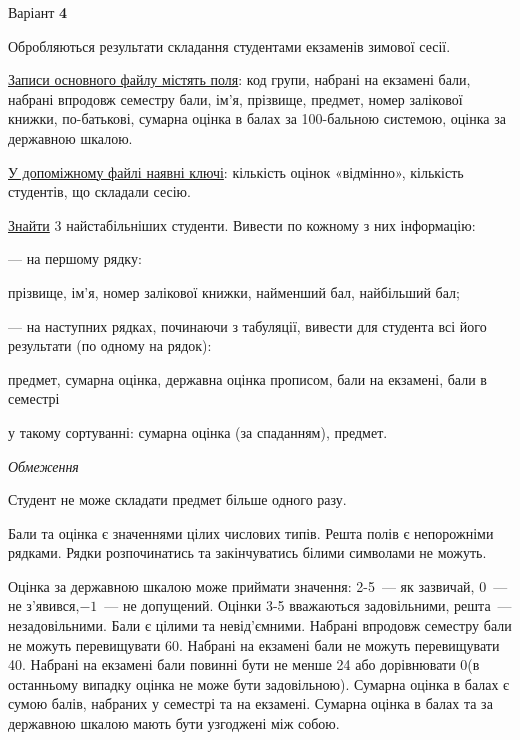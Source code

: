 \documentclass[11pt, ukrainian]{article}
\begin{document}
\par
\newpage
{\center Варіант  \No \textbf { 4 }\par}
\bigskip
Обробляються результати складання студентами екзаменів зимової сесії.

\underline{Записи основного файлу містять поля}: код групи, набрані на екзамені бали, набрані впродовж семестру бали, ім’я, прізвище, предмет, номер залікової книжки, по-батькові, сумарна оцінка в балах за 100-бальною системою, оцінка за державною шкалою.

\underline{У допоміжному файлі наявні ключі}: кількість оцінок «відмінно», кількість студентів, що складали сесію.

\underline{Знайти} 3 найстабільніших студенти. Вивести по кожному з них інформацію:\par
{\noindent}--- на першому рядку:\par
прізвище, ім’я, номер залікової книжки, найменший бал, найбільший бал;

{\noindent}--- на наступних рядках, починаючи з табуляції, вивести для студента всі його результати (по одному на рядок):\par
предмет, сумарна оцінка, державна оцінка прописом, бали на екзамені, бали в семестрі

{\noindent}у такому сортуванні: сумарна оцінка (за спаданням), предмет.


\bigskip\textit{Обмеження}

Студент не може складати предмет більше одного разу.

Бали та оцінка є значеннями цілих числових типів. Решта полів є непорожніми рядками.
Рядки розпочинатись та закінчуватись білими символами не можуть.

Оцінка за державною шкалою може приймати значення: 2-5~--- як зазвичай, 0~--- не з’явився,$-1$~--- не допущений. 
Оцінки 3-5 вважаються задовільними, решта~--- незадовільними. 
Бали є цілими та невід’ємними.
Набрані впродовж семестру бали не можуть перевищувати 60. 
Набрані на екзамені бали не можуть перевищувати 40. 
Набрані на екзамені бали повинні бути не менше 24 або дорівнювати 0(в останньому випадку оцінка не може бути задовільною). 
Сумарна оцінка в балах є сумою балів, набраних у семестрі та на екзамені.
Сумарна оцінка в балах та за державною шкалою мають бути узгоджені між собою.
\end{document}

